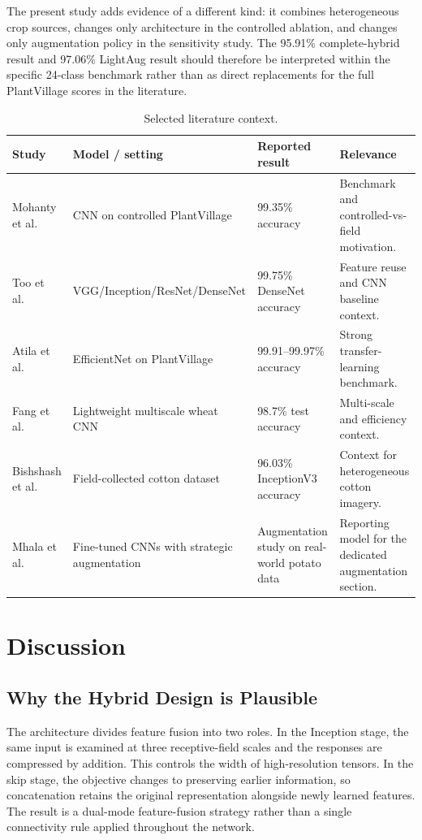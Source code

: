 \documentclass[a4paper,fleqn]{cas-dc}
\begin{document}
The present study adds evidence of a different kind: it combines heterogeneous crop sources, changes only architecture in the controlled ablation, and changes only augmentation policy in the sensitivity study. The 95.91\% complete-hybrid result and 97.06\% LightAug result should therefore be interpreted within the specific 24-class benchmark rather than as direct replacements for the full PlantVillage scores in the literature.

\begin{table}[!t]
\centering
\caption{Selected literature context.}
\label{tab:literature}
\small
\begin{tabular}{p{3.2cm}p{4.0cm}p{2.4cm}p{5.0cm}}
\toprule
Study & Model / setting & Reported result & Relevance \\
\midrule
Mohanty et al.~\citep{mohanty2016} & CNN on controlled PlantVillage & 99.35\% accuracy & Benchmark and controlled-vs-field motivation. \\
Too et al.~\citep{too2019} & VGG/Inception/ResNet/DenseNet & 99.75\% DenseNet accuracy & Feature reuse and CNN baseline context. \\
Atila et al.~\citep{atila2021} & EfficientNet on PlantVillage & 99.91--99.97\% accuracy & Strong transfer-learning benchmark. \\
Fang et al.~\citep{fang2023} & Lightweight multiscale wheat CNN & 98.7\% test accuracy & Multi-scale and efficiency context. \\
Bishshash et al.~\citep{cotton2024} & Field-collected cotton dataset & 96.03\% InceptionV3 accuracy & Context for heterogeneous cotton imagery. \\
Mhala et al.~\citep{mhala2025} & Fine-tuned CNNs with strategic augmentation & Augmentation study on real-world potato data & Reporting model for the dedicated augmentation section. \\
\bottomrule
\end{tabular}
\end{table}

\section{Discussion}
\subsection{Why the Hybrid Design is Plausible}
The architecture divides feature fusion into two roles. In the Inception stage, the same input is examined at three receptive-field scales and the responses are compressed by addition. This controls the width of high-resolution tensors. In the skip stage, the objective changes to preserving earlier information, so concatenation retains the original representation alongside newly learned features. The result is a dual-mode feature-fusion strategy rather than a single connectivity rule applied throughout the network.
\end{document}
